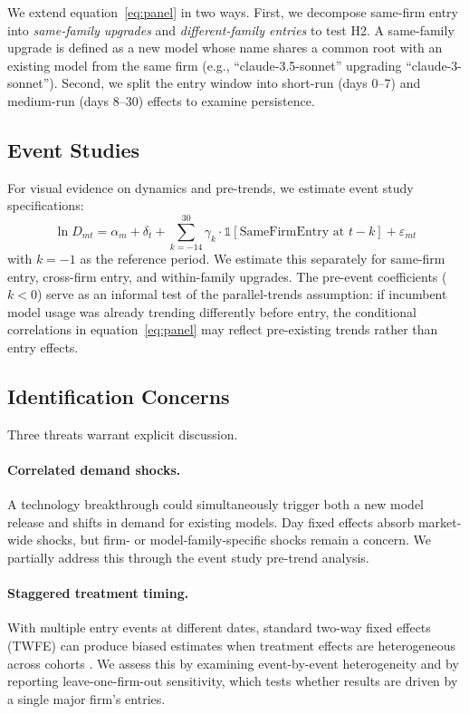 \documentclass[11pt, a4paper]{article}
\begin{document}
We extend equation~\eqref{eq:panel} in two ways. First, we decompose same-firm entry into \emph{same-family upgrades} and \emph{different-family entries} to test H2. A same-family upgrade is defined as a new model whose name shares a common root with an existing model from the same firm (e.g., ``claude-3.5-sonnet'' upgrading ``claude-3-sonnet''). Second, we split the entry window into short-run (days 0--7) and medium-run (days 8--30) effects to examine persistence.

\subsection{Event Studies}

For visual evidence on dynamics and pre-trends, we estimate event study specifications:
\begin{equation}
\ln D_{mt} = \alpha_m + \delta_t + \sum_{k=-14}^{30} \gamma_k \cdot \mathbb{1}[\text{SameFirmEntry at } t - k] + \varepsilon_{mt}
\label{eq:eventstudy}
\end{equation}
with $k = -1$ as the reference period. We estimate this separately for same-firm entry, cross-firm entry, and within-family upgrades. The pre-event coefficients ($k < 0$) serve as an informal test of the parallel-trends assumption: if incumbent model usage was already trending differently before entry, the conditional correlations in equation~\eqref{eq:panel} may reflect pre-existing trends rather than entry effects.

\subsection{Identification Concerns}

Three threats warrant explicit discussion.

\paragraph{Correlated demand shocks.} A technology breakthrough could simultaneously trigger both a new model release and shifts in demand for existing models. Day fixed effects absorb market-wide shocks, but firm- or model-family-specific shocks remain a concern. We partially address this through the event study pre-trend analysis.

\paragraph{Staggered treatment timing.} With multiple entry events at different dates, standard two-way fixed effects (TWFE) can produce biased estimates when treatment effects are heterogeneous across cohorts \citep{dechaisemartin2020twoway, goodmanbacon2021}. We assess this by examining event-by-event heterogeneity and by reporting leave-one-firm-out sensitivity, which tests whether results are driven by a single major firm's entries.
\end{document}
